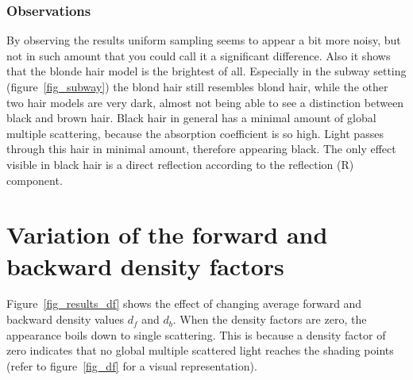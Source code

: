 \documentclass[11pt,a4paper]{report}
\begin{document}
\subsubsection{Observations}

By observing the results uniform sampling seems to appear a bit more noisy, but not in such amount that you could call it a significant difference. Also it shows that the blonde hair model is the brightest of all. Especially in the subway setting (figure~\ref{fig_subway}) the blond hair still resembles blond hair, while the other two hair models are very dark, almost not being able to see a distinction between black and brown hair.
Black hair in general has a minimal amount of global multiple scattering, because the absorption coefficient is so high. Light passes through this hair in minimal amount, therefore appearing black. The only effect visible in black hair is a direct reflection according to the reflection (R) component.


\section{Variation of the forward and backward density factors}

Figure~\ref{fig_results_df} shows the effect of changing average forward and backward density values $d_f$ and $d_b$. When the density factors are zero, the appearance boils down to single scattering. This is because a density factor of zero indicates that no global multiple scattered light reaches the shading points (refer to figure~\ref{fig_df} for a visual representation).

\end{document}

